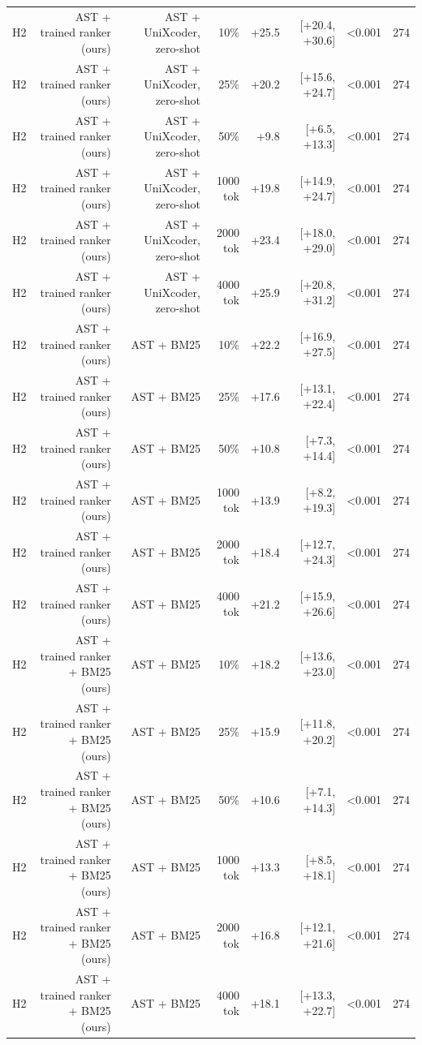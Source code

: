 \begin{tabular}{lrrrrrrr}
H2 & AST + trained ranker (ours) & AST + UniXcoder, zero-shot & 10\% & +25.5 & [+20.4, +30.6] & <0.001 & 274 \\
H2 & AST + trained ranker (ours) & AST + UniXcoder, zero-shot & 25\% & +20.2 & [+15.6, +24.7] & <0.001 & 274 \\
H2 & AST + trained ranker (ours) & AST + UniXcoder, zero-shot & 50\% & +9.8 & [+6.5, +13.3] & <0.001 & 274 \\
H2 & AST + trained ranker (ours) & AST + UniXcoder, zero-shot & 1000 tok & +19.8 & [+14.9, +24.7] & <0.001 & 274 \\
H2 & AST + trained ranker (ours) & AST + UniXcoder, zero-shot & 2000 tok & +23.4 & [+18.0, +29.0] & <0.001 & 274 \\
H2 & AST + trained ranker (ours) & AST + UniXcoder, zero-shot & 4000 tok & +25.9 & [+20.8, +31.2] & <0.001 & 274 \\
H2 & AST + trained ranker (ours) & AST + BM25 & 10\% & +22.2 & [+16.9, +27.5] & <0.001 & 274 \\
H2 & AST + trained ranker (ours) & AST + BM25 & 25\% & +17.6 & [+13.1, +22.4] & <0.001 & 274 \\
H2 & AST + trained ranker (ours) & AST + BM25 & 50\% & +10.8 & [+7.3, +14.4] & <0.001 & 274 \\
H2 & AST + trained ranker (ours) & AST + BM25 & 1000 tok & +13.9 & [+8.2, +19.3] & <0.001 & 274 \\
H2 & AST + trained ranker (ours) & AST + BM25 & 2000 tok & +18.4 & [+12.7, +24.3] & <0.001 & 274 \\
H2 & AST + trained ranker (ours) & AST + BM25 & 4000 tok & +21.2 & [+15.9, +26.6] & <0.001 & 274 \\
H2 & AST + trained ranker + BM25 (ours) & AST + BM25 & 10\% & +18.2 & [+13.6, +23.0] & <0.001 & 274 \\
H2 & AST + trained ranker + BM25 (ours) & AST + BM25 & 25\% & +15.9 & [+11.8, +20.2] & <0.001 & 274 \\
H2 & AST + trained ranker + BM25 (ours) & AST + BM25 & 50\% & +10.6 & [+7.1, +14.3] & <0.001 & 274 \\
H2 & AST + trained ranker + BM25 (ours) & AST + BM25 & 1000 tok & +13.3 & [+8.5, +18.1] & <0.001 & 274 \\
H2 & AST + trained ranker + BM25 (ours) & AST + BM25 & 2000 tok & +16.8 & [+12.1, +21.6] & <0.001 & 274 \\
H2 & AST + trained ranker + BM25 (ours) & AST + BM25 & 4000 tok & +18.1 & [+13.3, +22.7] & <0.001 & 274 \\
\bottomrule
\end{tabular}

